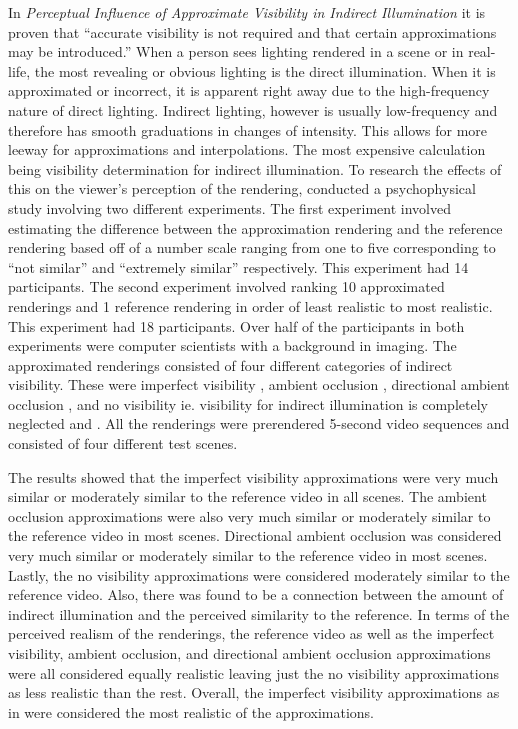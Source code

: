 In \textit{Perceptual Influence of Approximate Visibility in Indirect Illumination} \cite{Yu2009} it is proven that “accurate visibility is not required and that certain approximations may be introduced.”  When a person sees lighting rendered in a scene or in real-life, the most revealing or obvious lighting is the direct illumination.  When it is approximated or incorrect, it is apparent right away due to the high-frequency nature of direct lighting.  Indirect lighting, however is usually low-frequency and therefore has smooth graduations in changes of intensity.  This allows for more leeway for approximations and interpolations.  The most expensive calculation being visibility determination for indirect illumination.    To research the effects of this on the viewer's perception of the rendering, \cite{Yu2009} conducted a psychophysical study involving two different experiments.  The first experiment involved estimating the difference between the approximation rendering and the reference rendering based off of a number scale ranging from one to five corresponding to “not similar” and “extremely similar” respectively.  This experiment had 14 participants.  The second experiment involved ranking 10 approximated renderings and 1 reference rendering in order of least realistic to most realistic.  This experiment had 18 participants.  Over half of the participants in both experiments were computer  scientists with a background in imaging.  The approximated renderings consisted of four different categories of indirect visibility.  These were imperfect visibility \cite{Ritschel2008}, ambient occlusion \cite{Zhukov1998}, directional ambient occlusion \cite{Sloan2007} \cite{Ritschel2009}, and no visibility ie. visibility for indirect illumination is completely neglected \cite{Dachsbacher2005} and \cite{Dachsbacher2006}.  All the renderings were prerendered 5-second video sequences and consisted of four different test scenes.

The results showed that the imperfect visibility approximations were very much similar or moderately similar to the reference video in all scenes.  The ambient occlusion approximations were also very much similar or moderately similar to the reference video in most scenes.  Directional ambient occlusion was considered very much similar or moderately similar to the reference video in most scenes.  Lastly, the no visibility approximations were considered moderately similar to the reference video.  Also, there was found to be a connection between the amount of indirect illumination and the perceived similarity to the reference.  In terms of the perceived realism of the renderings, the reference video as well as the imperfect visibility, ambient occlusion, and directional ambient occlusion approximations were all considered equally realistic leaving just the no visibility approximations as less realistic than the rest.  Overall, the imperfect visibility approximations as in \cite{Ritschel2008} were considered the most realistic of the approximations.


